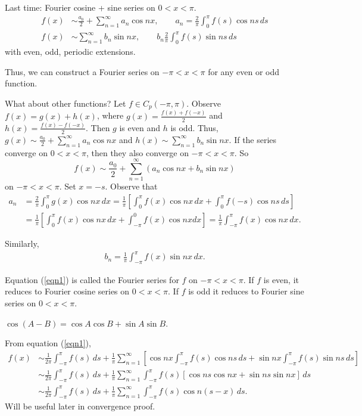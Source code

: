\documentclass[]{article}
\begin{document}
Last time: Fourier cosine + sine series on $0<x<\pi$.
\begin{align} f(x) &\sim \frac{a_0}{2} + \sum_{n=1}^{\infty} a_n \cos{nx}, \qquad a_n=\frac{2}{\pi} \int_0^\pi f(s) \cos{ns} \, ds \\
f(x) &\sim \sum_{n=1}^{\infty} b_n \sin{nx}, \qquad b_n \frac{2}{\pi} \int_0^\pi f(s) \sin{ns} \, ds\end{align}
with even, odd, periodic extensions.

Thus, we can construct a Fourier series on $-\pi<x<\pi$ for any even or odd function.

What about other functions?
Let $f\in C_p(-\pi,\pi)$.
Observe $f(x) = g(x) + h(x)$, where $g(x) = \frac{f(x) + f(-x)}{2}$ and $h(x) = \frac{f(x) - f(-x)}{2}$. Then $g$ is even and $h$ is odd.
Thus, $g(x) \sim \frac{a_0}{2} + \sum_{n=1}^\infty a_n \cos{nx}$ and $h(x)\sim\sum_{n=1}^\infty b_n \sin{nx}$.
If the series converge on $0<x<\pi$, then they also converge on $-\pi<x<\pi$. So \begin{equation}f(x) \sim \frac{a_0}{2} + \sum_{n=1}^\infty \left( a_n \cos{nx} + b_n \sin{nx}\right) \label{eqn1} \end{equation} on $-\pi < x < \pi$.
Set $x=-s$.
Observe that \begin{align*}a_n &= \frac{2}{\pi} \int_0^\pi g(x)\cos{nx} \, dx = \frac{1}{\pi} \left[ \int_0^\pi f(x) \cos{nx} \, dx + \int_0^\pi f(-s) \cos{ns} \, ds \right] \\ &=\frac{1}{\pi} \left[ \int_0^\pi f(x) \cos{nx}\, dx + \int_{-\pi}^0 f(x) \cos{nx} dx \right] = \frac{1}{\pi} \int_{-\pi}^\pi f(x) \cos{nx} \, dx .\end{align*}

Similarly,
\begin{align*}
b_n = \frac{1}{\pi} \int_{-\pi}^{\pi} f(x) \sin{nx} \, dx.
\end{align*}

Equation (\ref{eqn1}) is called the Fourier series for $f$ on $-\pi < x <\pi$. If $f$ is even, it reduces to Fourier cosine series on $0<x<\pi$. If $f$ is odd it reduces to Fourier sine series on $0<x<\pi$.

\begin{recall}
	$\cos{(A-B)} = \cos{A} \cos{B} + \sin{A} \sin{B}$.
\end{recall}

From equation (\ref{eqn1}),
\begin{align*} f(x) &\sim \frac{1}{2\pi} \int_{-\pi}^\pi f(s) \, ds + \frac{1}{\pi} \sum_{n=1}^\infty \left[ \cos{nx} \int_{-\pi}^\pi f(s) \cos{ns} \, ds + \sin{nx} \int_{-\pi}^\pi f(s) \sin{ns} \, ds \right] \\
&\sim \frac{1}{2\pi} \int_{-\pi}^\pi f(s) \, ds + \frac{1}{\pi} \sum_{n=1}^\infty \int_{-\pi}^\pi f(s) \left[ \cos{ns}\cos{nx} + \sin{ns}\sin{nx} \right] \, ds \\
&\sim \frac{1}{2\pi} \int_{-\pi}^\pi f(s) \, ds + \frac{1}{\pi} \sum_{n=1}^\infty \int_{-\pi}^\pi f(s) \cos{n(s-x)} \, ds .\end{align*}
Will be useful later in convergence proof.
\end{document}
